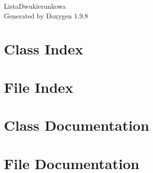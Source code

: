 \documentclass[twoside]{book}
\newcommand{\+}{\discretionary{\mbox{\scriptsize$\hookleftarrow$}}{}{}}
\newcommand{\clearemptydoublepage}{%
    \newpage{\pagestyle{empty}\cleardoublepage}%
  }
\begin{document}
  \raggedbottom
    \hypersetup{pageanchor=false,
                bookmarksnumbered=true,
                pdfencoding=unicode
               }
  \begin{titlepage}
  \vspace*{7cm}
  \begin{center}%
  {\Large Lista\+Dwukierunkowa}\\
  \vspace*{1cm}
  {\large Generated by Doxygen 1.9.8}\\
  \end{center}
  \end{titlepage}
  \clearemptydoublepage
  \tableofcontents
  \clearemptydoublepage
  \hypersetup{pageanchor=true}
\chapter{Class Index}

\chapter{File Index}

\chapter{Class Documentation}




\chapter{File Documentation}




  \backmatter
  \newpage
  \clearemptydoublepage
  \printindex
\end{document}
